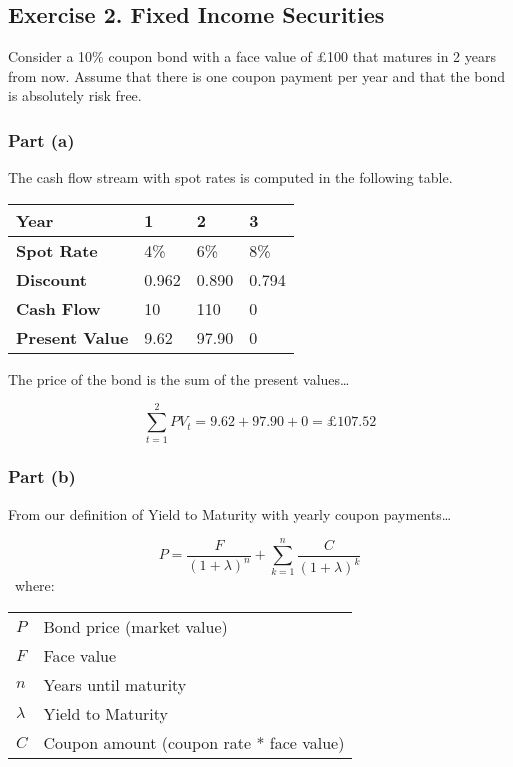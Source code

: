 \documentclass[11pt]{article}
\makeatletter
\newenvironment{conditions}
  {\par\vspace{\abovedisplayskip}\noindent\begin{tabular}{>{$}l<{$} @{${}={}$} l}}
  {\end{tabular}\par\vspace{\belowdisplayskip}}
\makeatother
\begin{document}
\subsection*{Exercise 2. Fixed Income Securities}

Consider a 10\% coupon bond with a face value of £100 that matures in 2 years
from now. Assume that there is one coupon payment per year and that the bond is
absolutely risk free.

\subsubsection*{Part (a)}

The cash flow stream with spot rates is computed in the following table.

\begin{center}
  \begin{tabular}{| l | l | l | l |}
    \hline
    \textbf{Year}           & 1     & 2     & 3      \\ \hline
    \textbf{Spot Rate}      & 4\%   & 6\%   & 8\%    \\ \hline
    \textbf{Discount}       & 0.962 & 0.890 & 0.794  \\ \hline
    \textbf{Cash Flow}      & 10    & 110   & 0      \\ \hline
    \textbf{Present Value}  & 9.62  & 97.90 & 0      \\ \hline
  \end{tabular}
\end{center}

The price of the bond is the sum of the present values\dots

\[\sum_{t=1}^{2} PV_{t} = 9.62 + 97.90 + 0 = £107.52\]

\subsubsection*{Part (b)}

From our definition of Yield to Maturity with yearly coupon payments\dots

\setcounter{equation}{0}
\begin{equation}
P = \frac{F}{\left(1 + \lambda\right)^{n}} + \sum_{k=1}^{n} \frac{C}{\left(1 + \lambda\right)^{k}}
\end{equation}
\
where:

\begin{conditions}
  P               & Bond price (market value) \\
  F               & Face value \\
  n               & Years until maturity \\
  \lambda         & Yield to Maturity \\
  C               & Coupon amount (coupon rate * face value)
\end{conditions}
\end{document}
